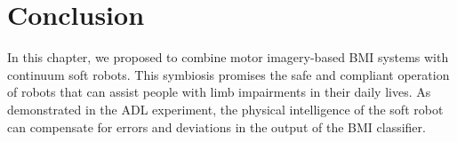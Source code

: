 \section{Conclusion}
In this chapter, we proposed to combine motor imagery-based \gls{BMI} systems with continuum soft robots. This symbiosis promises the safe and compliant operation of robots that can assist people with limb impairments in their daily lives.
As demonstrated in the \gls{ADL} experiment, the physical intelligence of the soft robot can compensate for errors and deviations in the output of the \gls{BMI} classifier.
